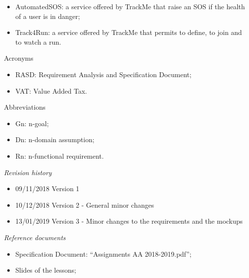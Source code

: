 \documentclass{article}
\begin{document}
\begin{legal}
\begin{legal}
\begin{legal}
{\begin{itemize}
				\item AutomatedSOS: a service offered by TrackMe that raise an SOS if the health of a user is in danger;\\
				\item Track4Run: a service offered by TrackMe that permits to define, to join and to watch a run.\\
				\end{itemize}
			}	
			\item Acronyms\\
			{\normalfont	
				\begin{itemize}
				\item RASD: Requirement Analysis and Specification Document;\\
				\item VAT: Value Added Tax.\\
				\end{itemize}
			}
			\item Abbreviations\\
			{\normalfont	
				\begin{itemize}
				\item Gn: n-goal;\\
				\item Dn: n-domain assumption;\\
				\item Rn: n-functional requirement.\\
				\end{itemize}
			}
			\end{legal}
		\item \textit{Revision history}\\
		{\normalfont
			\begin{itemize}
			\item 09/11/2018		Version 1\\
			\item 10/12/2018		Version 2 - General minor changes\\
			\item 13/01/2019		Version 3 - Minor changes to the requirements and the mockups\\
			\end{itemize}
		}
		\item \textit{Reference documents}\\
		{\normalfont	
			\begin{itemize}
			\item Specification Document: “Assignments AA 2018-2019.pdf”;\\
			\item Slides of the lessons;\\

\end{itemize}}
\end{legal}
\end{legal}
\end{document}
